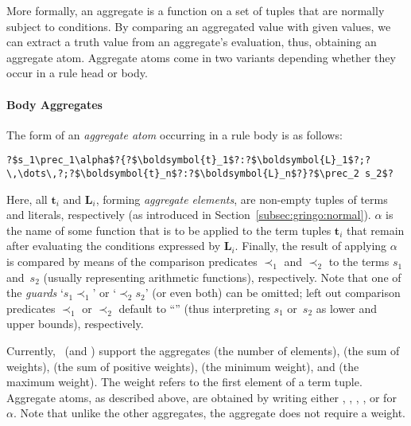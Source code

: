More formally,
an aggregate is a function on a set of tuples that are normally subject to conditions.
By comparing an aggregated value with given values, we can extract a truth value from an aggregate's evaluation,
thus, obtaining an aggregate atom.
Aggregate atoms come in two variants depending whether they occur in a rule head or body.

\paragraph{Body Aggregates}
The form of an \emph{aggregate atom} occurring in a rule body is as follows:
%
\begin{lstlisting}[numbers=none,escapechar=?]
?$s_1\prec_1\alpha$?{?$\boldsymbol{t}_1$?:?$\boldsymbol{L}_1$?;?\,\dots\,?;?$\boldsymbol{t}_n$?:?$\boldsymbol{L}_n$?}?$\prec_2 s_2$?
\end{lstlisting}
%
Here, all $\boldsymbol{t}_i$ and $\boldsymbol{L}_i$, forming \emph{aggregate elements}, are non-empty tuples of terms and literals, respectively
(as introduced in Section~\ref{subsec:gringo:normal}).
$\alpha$ is the name of some function that is to be applied to the term tuples $\boldsymbol{t}_i$
that remain after evaluating the conditions expressed by $\boldsymbol{L}_i$.
%
Finally,
the result of applying $\alpha$ is compared by means of the comparison predicates $\prec_1$ and $\prec_2$
to the terms $s_1$ and~$s_2$ (usually representing arithmetic functions), respectively.
Note that one of the \emph{guards} `$s_1\prec_1$' or `$\prec_2 s_2$'%
(or even both) can be omitted;
left out comparison predicates $\prec_1$ or $\prec_2$ default to ``\code{<=}'' (thus interpreting $s_1$ or~$s_2$ as lower and upper bounds),
respectively.

Currently, \gringo\ (and \clingo) support the aggregates
%
(the number of elements),
%
(the sum of weights),
%
(the sum of positive weights),
%
(the minimum weight), and
%
(the maximum weight).
The weight refers to the first element of a term tuple.
Aggregate atoms, as described above, are obtained by writing
either , , , , or  for $\alpha$.
%
Note that unlike the other aggregates, the  aggregate does not require a weight.

